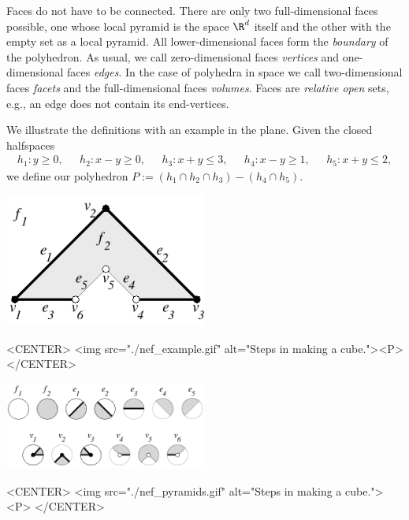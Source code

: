 Faces do not have to be connected. There are only two full-dimensional
faces possible, one whose local pyramid is the space $\R^d$ itself and
the other with the empty set as a local pyramid.
All lower-dimensional faces form the \emph{boundary} of
the polyhedron. As usual, we call zero-dimensional faces {\em
vertices} and one-dimensional faces \emph{edges}. In the case of
polyhedra in space we call two-dimensional faces \emph{facets} and
the full-dimensional faces \emph{volumes}. Faces are \emph{relative
open} sets, e.g., an edge does not contain its end-vertices.

    We illustrate the definitions with an example in the plane.
    Given the closed halfspaces
    \[\begin{array}{lllll}
        h_1: y \ge 0,\ \ \    &
        h_2: x - y \ge 0,\ \ \ &
        h_3: x + y \le 3,\ \ \ &
        h_4: x - y \ge 1,\ \ \ &
        h_5: x + y \le 2, 
      \end{array}
    \]
    we define our polyhedron $P := ( h_1 \cap h_2 \cap h_3) - ( h_4 \cap h_5)$.

\begin{minipage}[t]{0.5\textwidth}
\begin{ccTexOnly}
    \begin{center}
      \parbox{0.5\textwidth}{%
          \includegraphics[width=0.50\textwidth]{Nef_3/fig/nef_example}%
      }
    \end{center}
\end{ccTexOnly}

\begin{ccHtmlOnly}
    <CENTER>
        <img src="./nef_example.gif" alt="Steps in making a cube."><P>
    </CENTER>
\end{ccHtmlOnly}
\end{minipage}
\begin{minipage}[t]{0.5\textwidth}
\begin{ccTexOnly}
    \begin{center}
      \parbox{0.5\textwidth}{%
          \includegraphics[width=0.50\textwidth]{Nef_3/fig/nef_pyramids}%
      }
    \end{center}
\end{ccTexOnly}

\begin{ccHtmlOnly}
    <CENTER>
        <img src="./nef_pyramids.gif" alt="Steps in making a cube."><P>
    </CENTER>
\end{ccHtmlOnly}
\end{minipage}

